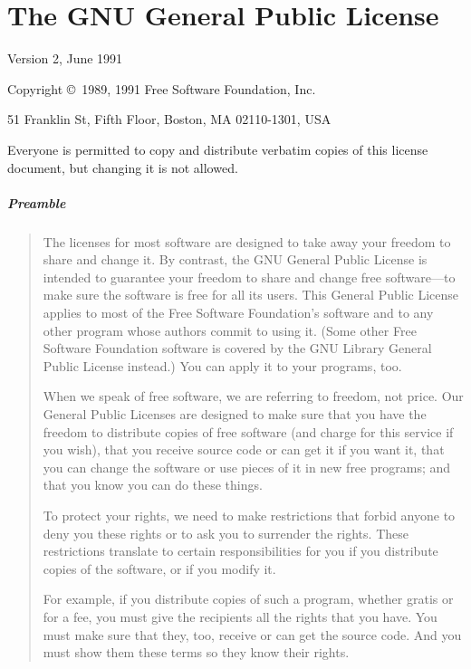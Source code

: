 \documentclass{book}
\begin{document}
{\small
\chapter{The GNU General Public License}
\label{chp:GPL}
\begin{center}
{\parindent 0in

Version 2, June 1991

Copyright \copyright\ 1989, 1991 Free Software Foundation, Inc.

\bigskip

51 Franklin St, Fifth Floor, Boston, MA  02110-1301, USA

\bigskip

Everyone is permitted to copy and distribute verbatim copies
of this license document, but changing it is not allowed.
}

\paragraph{Preamble}
\begin{quote}
The licenses for most software are designed to take away your freedom to
share and change it.  By contrast, the GNU General Public License is
intended to guarantee your freedom to share and change free software---to
make sure the software is free for all its users.  This General Public
License applies to most of the Free Software Foundation's software and to
any other program whose authors commit to using it.  (Some other Free
Software Foundation software is covered by the GNU Library General Public
License instead.)  You can apply it to your programs, too.

When we speak of free software, we are referring to freedom, not price.
Our General Public Licenses are designed to make sure that you have the
freedom to distribute copies of free software (and charge for this service
if you wish), that you receive source code or can get it if you want it,
that you can change the software or use pieces of it in new free programs;
and that you know you can do these things.

To protect your rights, we need to make restrictions that forbid anyone to
deny you these rights or to ask you to surrender the rights.  These
restrictions translate to certain responsibilities for you if you
distribute copies of the software, or if you modify it.

For example, if you distribute copies of such a program, whether gratis or
for a fee, you must give the recipients all the rights that you have.  You
must make sure that they, too, receive or can get the source code.  And
you must show them these terms so they know their rights.


\end{quote}
\end{center}}
\end{document}
